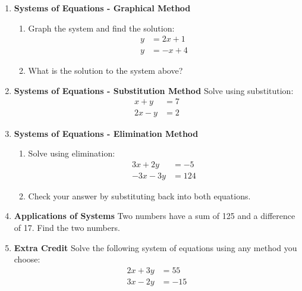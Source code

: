 \documentclass[12pt]{article}
\begin{document}
\begin{enumerate}
    \item \textbf{Systems of Equations - Graphical Method}
    \begin{enumerate}
        \item Graph the system and find the solution:
        \begin{align*}
        y &= 2x + 1 \\
        y &= -x + 4
        \end{align*}
        \item What is the solution to the system above?
    \end{enumerate}

    \item \textbf{Systems of Equations - Substitution Method} \newline Solve using substitution:
        \begin{align*}
        x + y &= 7 \\
        2x - y &= 2
        \end{align*}

    \item \textbf{Systems of Equations - Elimination Method}
    \begin{enumerate}
        \item Solve using elimination:
        \begin{align*}
        3x + 2y &= -5 \\
        -3x - 3y &= 124
        \end{align*}
        \item Check your answer by substituting back into both equations.
    \end{enumerate}

    \item \textbf{Applications of Systems} Two numbers have a sum of 125 and a difference of 17.  Find the two numbers.

    \item \textbf{Extra Credit} Solve the following system of equations using any method you choose:
    \begin{align*}
    2x + 3y &= 55 \\
    3x - 2y &= -15
    \end{align*}
\end{enumerate}
\end{document}
